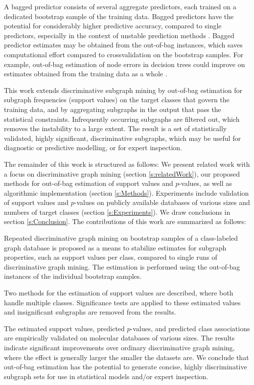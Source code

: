 \documentclass{sig-alternate}
\begin{document}
A bagged predictor consists of several aggregate predictors, each trained on a
dedicated bootstrap sample of the training data. Bagged predictors have the
potential for considerably higher predictive accuracy, compared to single
predictors, especially in the context of unstable prediction methods
\cite{breiman96oob}. Bagged predictor estimates may be obtained from the out-of-bag
instances, which saves computational effort compared to crossvalidation on the
bootstrap samples. For example, out-of-bag estimation of node errors in
decision trees could improve on estimates obtained from the training data as a
whole \cite{breiman96oob}.

This work extends discriminative subgraph mining by out-of-bag estimation for
subgraph frequencies (support values) on the target classes that govern the
training data, and by aggregating subgraphs in the output that pass the
statistical constraints.  Infrequently occurring subgraphs are filtered out, 
which removes the instability to a large extent. The
result is a set of statistically validated, highly significant,
discriminative subgraphs, which may be useful for diagnostic or predictive
modelling, or for expert inspection. 

The remainder of this work is structured as follows: We present related work
with a focus on discriminative graph mining (section \ref{s:relatedWork}), our
proposed methods for out-of-bag estimation of support values and $p$-values, as
well as algorithmic implementation (section \ref{s:Methods}).
Experiments include validation of support
values and $p$-values on publicly available databases of
various sizes and numbers of target classes (section \ref{s:Experiments}).
We draw conclusions in section \ref{s:Conclusion}.
The contributions of this work are summarized as follows:
\begin{itemize*}
  \item Repeated discriminative graph mining on bootstrap samples of a
    class-labeled graph database is proposed as a means to stabilize estimates
    for subgraph properties, such as support values per class, compared to
    single runs of discriminative graph mining. The estimation is performed
    using the out-of-bag instances of the individual bootstrap samples.
  \item Two methods for the estimation of support values are described, where both
    handle multiple classes. Significance tests are applied to these
    estimated values and insignificant subgraphs are removed from the results.  
  \item The estimated support values, predicted $p$-values, and predicted class
    associations are empirically validated on molecular databases of various
    sizes.  The results indicate significant improvements over 
    ordinary discriminative graph mining, where the effect is generally larger the
    smaller the datasets are.  We conclude that out-of-bag estimation has the
    potential to generate concise, highly discriminative subgraph sets for
    use in statistical models and/or expert inspection.
\end{itemize*}
\end{document}
